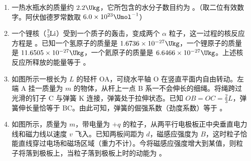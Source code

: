 \documentclass[\gkver]{gaokaozhenti}
\begin{document}
\begin{enumerate}
\item
一热水瓶水的质量约 $2.2\Ukg$，它所包含的水分子数目约为 。（取二位有效数字。阿伏伽德罗常数取 $6.0\times10^{23}\Umol^{-1}$）

\item
一个锂核（$\ce{^{7}_{3}Li}$）受到一个质子的轰击，变成两个 $\alpha$ 粒子，这一过程的核反应方程是 。已知一个氢原子的质量是 $1.6736\times10^{-27}\Ukg$，一个锂原子的质量是 $11.6505\times10^{-27}\Ukg$，一个氦原子的质量是 $6.6466\times10^{-27}\Ukg$。上述核反应所释放的能量等于 。

\item
如图所示一根长为 $L$ 的轻杆 OA，可绕水平轴 O 在竖直平面内自由转动。左端 A 挂一质量为 $m$ 的物体，从杆上一点 B 系一不会伸长的细绳。将绳跨过光滑的钉子 C 与弹簧 K 连接，弹簧处于拉伸状态。已知 $OB = OC = \frac{2}{3}L$，弹簧伸长量恰等于 BC。由此可知，弹簧的倔强系数（劲度系数）等于 。
\onepicture[align=right, w=5.43cm]{}

\item
如图所示，质量为 $m$，带电量为 $+q$ 的粒子，从两平行电极板正中央垂直电力线和磁力线以速度 $v$ 飞入。已知两板间距为 $d$，磁感应强度为 $B$，这时粒子恰能直线穿过电场和磁场区域（重力不计）。今将磁感应强度增大到某值，则粒子将落到极板上，当粒子落到极板上时的动能为 。
\onepicture[align=right, w=4.15cm]{}


\end{enumerate}
\end{document}
